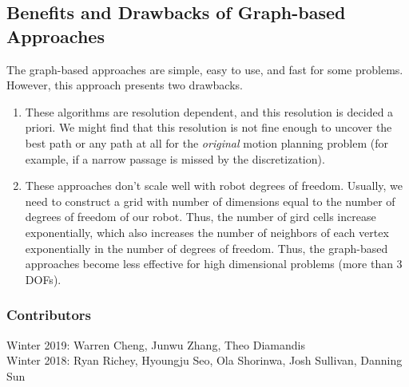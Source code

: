 \documentclass[twoside]{article}
\begin{document}
\subsection{Benefits and Drawbacks of Graph-based Approaches}
The graph-based approaches are simple, easy to use, and fast for some problems. However, this approach presents two drawbacks.
\begin{enumerate}
\item These algorithms are resolution dependent, and this resolution is decided a priori. We might find that this resolution is not fine enough to uncover the best path or any path at all for the \textit{original} motion planning problem (for example, if a narrow passage is missed by the discretization).
\item These approaches don't scale well with robot degrees of freedom. Usually, we need to construct a grid with number of dimensions equal to the number of degrees of freedom of our robot. Thus, the number of gird cells increase exponentially, which also increases the number of neighbors of each vertex exponentially in the number of degrees of freedom. Thus, the graph-based approaches become less effective for high dimensional problems (more than 3 DOFs).
\end{enumerate}




\printbibliography

\subsubsection*{Contributors}
Winter 2019: Warren Cheng,  Junwu Zhang, Theo Diamandis\\
Winter 2018: Ryan Richey, Hyoungju Seo, Ola Shorinwa, Josh Sullivan, Danning Sun
\end{document}
